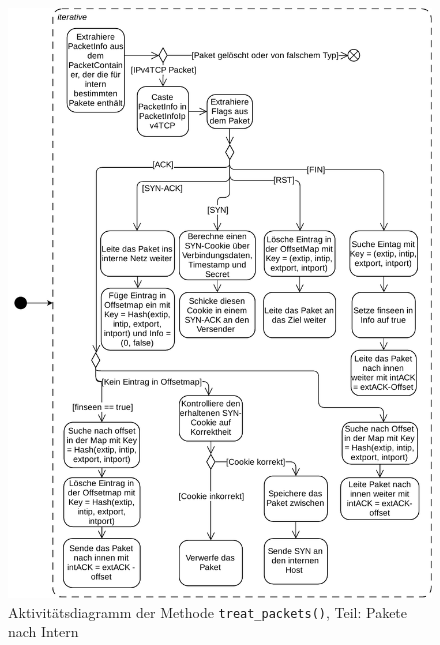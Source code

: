 \documentclass[../review_2.tex]{subfiles}
\begin{document}
\begin{figure}[h]
    \centering
    \includegraphics[width=0.98\linewidth]{img/treat_packets_0.pdf}
    \caption{Aktivitätsdiagramm der Methode \texttt{treat\_packets()}, Teil: Pakete nach Intern}
    \label{Aktivität_treat_packet_0}
\end{figure}
\end{document}
